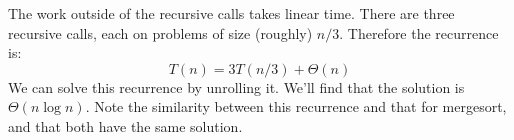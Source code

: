 \begin{prob}
\begin{subprobset}
\begin{subprob}
            \inputminted{python}{\thisdir/include/part_c.py}

            \begin{soln}
                The work outside of the recursive calls takes linear time. There
                are three recursive calls, each on problems of size (roughly) $n/3$.
                Therefore the recurrence is:
                \[
                    T(n) = 3T(n/3) + \Theta(n)
                \]
                We can solve this recurrence by unrolling it. We'll find that the solution is
                $\Theta(n \log n)$. Note the similarity between this recurrence and that
                for mergesort, and that both have the same solution.
            \end{soln}
        \end{subprob}

    \end{subprobset}

\end{prob}

